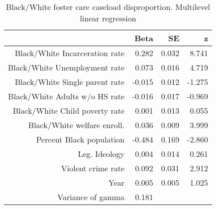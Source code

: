 \begin{table}[ht]
\centering
\begin{tabular}{rrrr}
  \hline
 & Beta & SE & z \\ 
  \hline
Black/White Incarceration rate & 0.282 & 0.032 & 8.741 \\ 
  Black/White Unemployment rate & 0.073 & 0.016 & 4.719 \\ 
  Black/White Single parent rate & -0.015 & 0.012 & -1.275 \\ 
  Black/White Adults w/o HS rate & -0.016 & 0.017 & -0.969 \\ 
  Black/White Child poverty rate & 0.001 & 0.013 & 0.055 \\ 
  Black/White welfare enroll.  & 0.036 & 0.009 & 3.999 \\ 
  Percent Black population & -0.484 & 0.169 & -2.860 \\ 
  Leg. Ideology & 0.004 & 0.014 & 0.261 \\ 
  Violent crime rate & 0.092 & 0.031 & 2.912 \\ 
  Year & 0.005 & 0.005 & 1.025 \\ 
  Variance of gamma & 0.181 &  &  \\ 
   \hline
\end{tabular}
\caption{Black/White foster care caseload disproportion. Multilevel linear regression} 
\label{b.d.tab}
\end{table}
